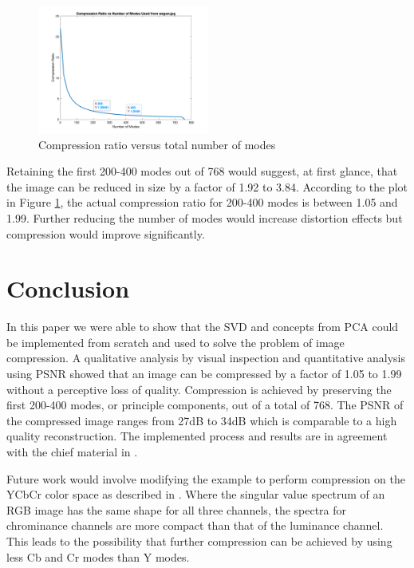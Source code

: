 \documentclass[conference]{IEEEtran}
\begin{document}
    \begin{figure}[t]
    \includegraphics[width=0.5\textwidth]{comprVsModes_rgb}
    \caption{Compression ratio versus total number of modes}
    \label{fig:comprvsr}
    \end{figure}
    
    Retaining the first 200-400 modes out of 768 would suggest, at first glance, that the image can be reduced in size by a factor of 1.92 to 3.84. According to the plot in Figure \ref{fig:comprvsr}, the actual compression ratio for 200-400 modes is between 1.05 and 1.99. Further reducing the number of modes would increase distortion effects but compression would improve significantly.

    \section{Conclusion}

    In this paper we were able to show that the SVD and concepts from PCA could be implemented from scratch and used to solve the problem of image compression. A qualitative analysis by visual inspection and quantitative analysis using PSNR showed that an image can be compressed by a factor of 1.05 to 1.99 without a perceptive loss of quality. Compression is achieved by preserving the first 200-400 modes, or principle components, out of a total of 768. The PSNR of the compressed image ranges from 27dB to 34dB which is comparable to a high quality reconstruction. The implemented process and results are in agreement with the chief material in \cite{jaradet_svd_image_compression}.
    
    Future work would involve modifying the example to perform compression on the YCbCr color space as described in \cite{xu_color_conversion}. Where the singular value spectrum of an RGB image has the same shape for all three channels, the spectra for chrominance channels are more compact than that of the luminance channel. This leads to the possibility that further compression can be achieved by using less Cb and Cr modes than Y modes.
\end{document}
